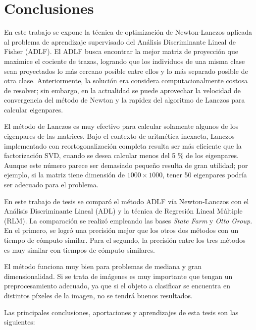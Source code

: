 \chapter{Conclusiones}
\label{ch:conclusion}

En este trabajo se expone la técnica de optimización de Newton-Lanczos aplicada al problema de aprendizaje supervisado del Análisis Discriminante Lineal de Fisher (ADLF). El ADLF busca encontrar la mejor matriz de proyección que maximice el cociente de trazas, logrando que los individuos de una misma clase sean proyectados lo más cercano posible entre ellos y lo más separado posible de otra clase. Anteriormente, la solución era considera computacionalmente costosa de resolver; sin embargo, en la actualidad se puede aprovechar la velocidad de convergencia del método de Newton y la rapidez del algoritmo de Lanczos para calcular eigenpares. 


El método de Lanczos es muy efectivo para calcular solamente algunos de los eigenpares de las matrices. Bajo el contexto de aritmética inexacta, Lanczos implementado con reortogonalización completa resulta ser más eficiente que la factorización SVD, cuando se desea calcular menos del 5 \% de los eigenpares. Aunque este número parece ser demasiado pequeño resulta de gran utilidad; por ejemplo, si la matriz tiene dimensión de $1000 \times 1000$, tener 50 eigenpares podría ser adecuado para el problema. 

\newpage
En este trabajo de tesis se comparó el método ADLF vía Newton-Lanczos con el Análisis Discriminante Lineal (ADL) y la técnica de Regresión Lineal Múltiple (RLM). La comparación se realizó empleando las bases \textit{State Farm} y \textit{Otto Group}. En el primero, se logró una precisión mejor que los otros dos métodos con un tiempo de cómputo similar. Para el segundo, la precisión entre los tres métodos es muy similar con tiempos de cómputo similares.

El método funciona muy bien para problemas de mediana y gran dimensionalidad. Si se trata de imágenes es muy importante que tengan un preprocesamiento adecuado, ya que si el objeto a clasificar se encuentra en distintos píxeles de la imagen, no se tendrá buenos resultados.

Las principales conclusiones, aportaciones y aprendizajes de esta tesis son las siguientes:

